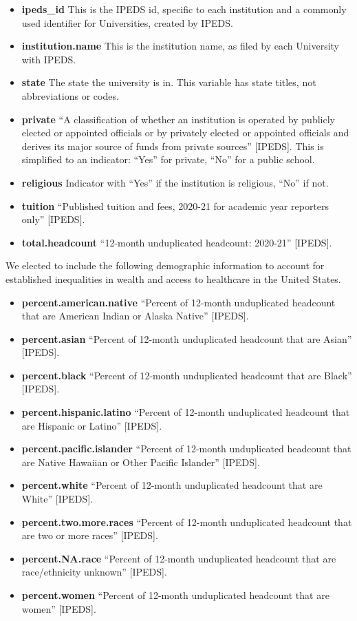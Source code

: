 \documentclass[
]{article}
\begin{document}
\begin{itemize}
\item
  \textbf{ipeds\_id} This is the IPEDS id, specific to each institution
  and a commonly used identifier for Universities, created by IPEDS.
\item
  \textbf{institution.name} This is the institution name, as filed by
  each University with IPEDS.
\item
  \textbf{state} The state the university is in. This variable has state
  titles, not abbreviations or codes.
\item
  \textbf{private} ``A classification of whether an institution is
  operated by publicly elected or appointed officials or by privately
  elected or appointed officials and derives its major source of funds
  from private sources'' {[}IPEDS{]}. This is simplified to an
  indicator: ``Yes'' for private, ``No'' for a public school.
\item
  \textbf{religious} Indicator with ``Yes'' if the institution is
  religious, ``No'' if not.
\item
  \textbf{tuition} ``Published tuition and fees, 2020-21 for academic
  year reporters only'' {[}IPEDS{]}.
\item
  \textbf{total.headcount} ``12-month unduplicated headcount: 2020-21''
  {[}IPEDS{]}.
\end{itemize}

We elected to include the following demographic information to account
for established inequalities in wealth and access to healthcare in the
United States.

\begin{itemize}
\item
  \textbf{percent.american.native} ``Percent of 12-month unduplicated
  headcount that are American Indian or Alaska Native'' {[}IPEDS{]}.
\item
  \textbf{percent.asian} ``Percent of 12-month unduplicated headcount
  that are Asian'' {[}IPEDS{]}.
\item
  \textbf{percent.black} ``Percent of 12-month unduplicated headcount
  that are Black'' {[}IPEDS{]}.
\item
  \textbf{percent.hispanic.latino} ``Percent of 12-month unduplicated
  headcount that are Hispanic or Latino'' {[}IPEDS{]}.
\item
  \textbf{percent.pacific.islander} ``Percent of 12-month unduplicated
  headcount that are Native Hawaiian or Other Pacific Islander''
  {[}IPEDS{]}.
\item
  \textbf{percent.white} ``Percent of 12-month unduplicated headcount
  that are White'' {[}IPEDS{]}.
\item
  \textbf{percent.two.more.races} ``Percent of 12-month unduplicated
  headcount that are two or more races'' {[}IPEDS{]}.
\item
  \textbf{percent.NA.race} ``Percent of 12-month unduplicated headcount
  that are race/ethnicity unknown'' {[}IPEDS{]}.
\item
  \textbf{percent.women} ``Percent of 12-month unduplicated headcount
  that are women'' {[}IPEDS{]}.
\end{itemize}
\end{document}

